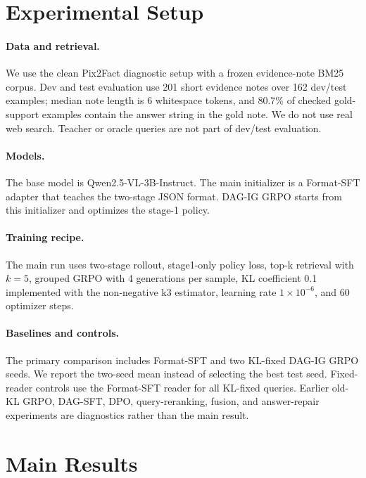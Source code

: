 \documentclass[11pt]{article}
\begin{document}


\section{Experimental Setup}

\paragraph{Data and retrieval.}
We use the clean Pix2Fact diagnostic setup with a frozen evidence-note BM25 corpus. Dev and test evaluation use 201 short evidence notes over 162 dev/test examples; median note length is 6 whitespace tokens, and 80.7\% of checked gold-support examples contain the answer string in the gold note. We do not use real web search. Teacher or oracle queries are not part of dev/test evaluation.

\paragraph{Models.}
The base model is Qwen2.5-VL-3B-Instruct. The main initializer is a Format-SFT adapter that teaches the two-stage JSON format. DAG-IG GRPO starts from this initializer and optimizes the stage-1 policy.

\paragraph{Training recipe.}
The main run uses two-stage rollout, stage1-only policy loss, top-k retrieval with \(k=5\), grouped GRPO with 4 generations per sample, KL coefficient 0.1 implemented with the non-negative k3 estimator, learning rate \(1\times10^{-6}\), and 60 optimizer steps.

\paragraph{Baselines and controls.}
The primary comparison includes Format-SFT and two KL-fixed DAG-IG GRPO seeds. We report the two-seed mean instead of selecting the best test seed. Fixed-reader controls use the Format-SFT reader for all KL-fixed queries. Earlier old-KL GRPO, DAG-SFT, DPO, query-reranking, fusion, and answer-repair experiments are diagnostics rather than the main result.

\section{Main Results}
\end{document}

